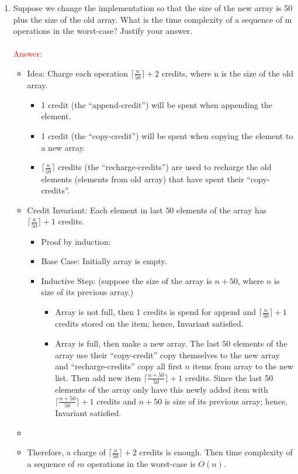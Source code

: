 \documentclass[11pt,twoside]{article}
\begin{document}
\begin{enumerate}[leftmargin=0pt]
\begin{enumerate}
\item
Suppose we change the implementation so that the size of the new array is 50 plus the size of the old array. What is the time complexity of a sequence of m
operations in the worst-case? Justify your answer.\\
\\
\textcolor{red}{\sc Answer:}
\begin{itemize}[label = {}]
\item Idea: Charge each operation $\lceil \frac{n}{50} \rceil + 2$ credits, where n is the size of the old array.
	\begin{itemize} 
	\item 1 credit  (the ``append-credit'') will be spent when appending the element.
	\item 1 credit (the ``copy-credit'') will be spent when copying the element to a new array.
	\item  $\lceil \frac{n}{50} \rceil$ credits (the ``recharge-credits'') are  used to recharge the old elements (elements from old array) that have spent their ``copy-credits''.
	\end{itemize}
\item Credit Invariant: Each element in last $50$ elements of the array has $\lceil \frac{n}{50} \rceil + 1$ credits.\\
	\begin{itemize}[label = {}]
	\item Proof by induction:
	\item Base Case: Initially array is empty.
	\item Inductive Step: (suppose the size of the array is $n+50$, where $n$ is size of its previous array.)
		\begin{itemize}[label = {-}] 
		\item  Array is not full, then 1 credits is spend for append and $\lceil \frac{n}{50} \rceil + 1$ credits stored on the item; hence, Invariant satisfied.
		\item  Array is full, then make a new array.  The last $50$ elements of the array use their ``copy-credit'' copy themselves to the new array 
		and  ``recharge-credits'' copy all first $n$ items from array to the new list. Then add new item $\lceil \frac{n+50}{50} \rceil + 1$  credits. Since the  last 50 elements of the array
		only have this newly added item with $\lceil \frac{n+50}{50} \rceil + 1$ credits and $n+50$ is size of its previous array; hence, Invariant satisfied.
		\end{itemize}	
	\end{itemize}
\item 
\item Therefore,  a charge of $\lceil \frac{n}{50} \rceil + 2$ credits is enough. Then time complexity of a sequence of $m$ operations in the worst-case is $O(n)$.	
\end{itemize}

\end{enumerate}

\end{enumerate}
\end{document}
